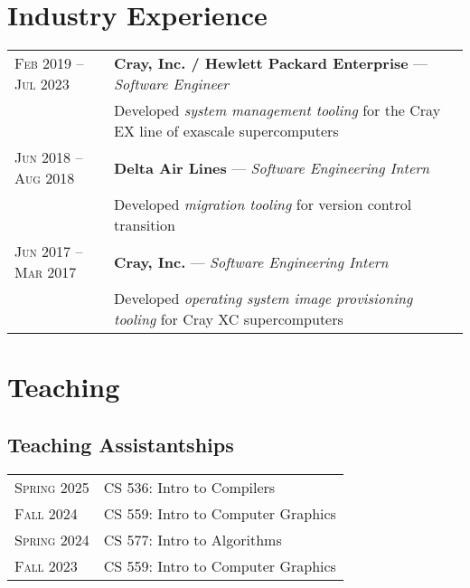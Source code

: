 \documentclass{article} %
\begin{document}
\section{Industry Experience}

\begin{tabular}{R{4cm}p{11cm}}
\textsc{Feb 2019 -- Jul 2023} & \textbf{Cray, Inc. / Hewlett Packard Enterprise} --- \textit{Software Engineer}\\ 
& \small Developed \emph{system management tooling} for the Cray EX line of exascale supercomputers\\


\textsc{Jun 2018 -- Aug 2018} & \textbf{Delta Air Lines} --- \textit{Software Engineering Intern} \\
& \small Developed \emph{migration tooling} for version control transition \\


\textsc{Jun 2017 -- Mar 2017} & \textbf{Cray, Inc.} --- \textit{Software Engineering Intern} \\
& \small Developed \emph{operating system image provisioning tooling} for Cray XC  supercomputers \\
\end{tabular}

\section{Teaching}

\subsection{Teaching Assistantships}
\begin{tabular}{R{4cm}p{11cm}}
    \textsc{Spring 2025} & CS 536: Intro to Compilers \\
    \textsc{Fall 2024} & CS 559: Intro to Computer Graphics \\
    \textsc{Spring 2024} & CS 577: Intro to Algorithms \\
    \textsc{Fall 2023} & CS 559: Intro to Computer Graphics \\
\end{tabular}

\end{document}
